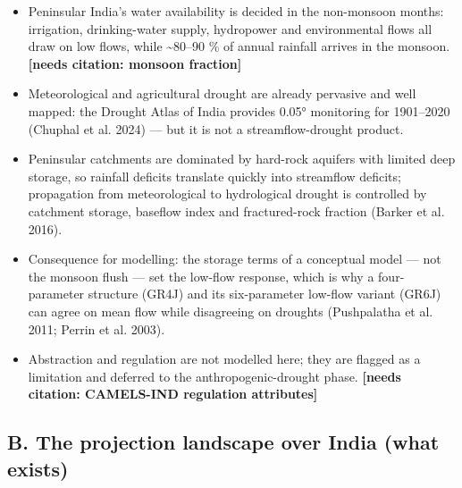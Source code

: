 \documentclass[
  11pt,
]{article}
\providecommand{\tightlist}{%
  \setlength{\itemsep}{0pt}\setlength{\parskip}{0pt}}
\begin{document}
\begin{itemize}
\tightlist
\item
  Peninsular India's water availability is decided in the non-monsoon
  months: irrigation, drinking-water supply, hydropower and
  environmental flows all draw on low flows, while \textasciitilde80--90
  \% of annual rainfall arrives in the monsoon. \textbf{{[}needs
  citation: monsoon fraction{]}}
\item
  Meteorological and agricultural drought are already pervasive and well
  mapped: the Drought Atlas of India provides 0.05° monitoring for
  1901--2020 (Chuphal et al. 2024) --- but it is not a
  streamflow-drought product.
\item
  Peninsular catchments are dominated by hard-rock aquifers with limited
  deep storage, so rainfall deficits translate quickly into streamflow
  deficits; propagation from meteorological to hydrological drought is
  controlled by catchment storage, baseflow index and fractured-rock
  fraction (Barker et al. 2016).
\item
  Consequence for modelling: the storage terms of a conceptual model ---
  not the monsoon flush --- set the low-flow response, which is why a
  four-parameter structure (GR4J) and its six-parameter low-flow variant
  (GR6J) can agree on mean flow while disagreeing on droughts
  (Pushpalatha et al. 2011; Perrin et al. 2003).
\item
  Abstraction and regulation are not modelled here; they are flagged as
  a limitation and deferred to the anthropogenic-drought phase.
  \textbf{{[}needs citation: CAMELS-IND regulation attributes{]}}
\end{itemize}

\subsection{B. The projection landscape over India (what
exists)}\label{b.-the-projection-landscape-over-india-what-exists}
\end{document}

